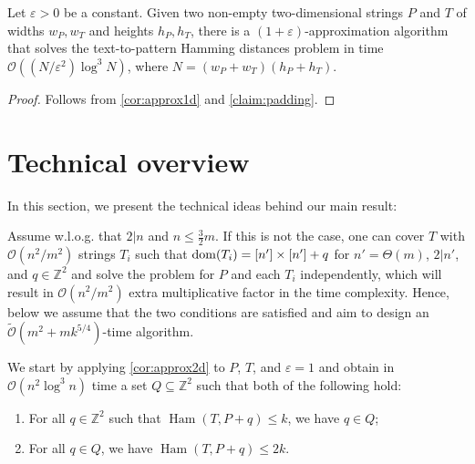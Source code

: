 \documentclass[twoside,leqno]{article}
\newcommand{\Z}{\mathbb{Z}}
\renewcommand{\O}{\mathcal{O}}
\newcommand{\tO}{\tilde{\mathcal{O}}}
\DeclareMathOperator*{\Ham}{Ham}
\begin{document}
\begin{corollary}\label{cor:approx2d}
Let $\varepsilon > 0$ be a constant. Given two non-empty two-dimensional strings $P$ and $T$ of widths $w_P, w_T$ and heights $h_P, h_T$, there is a $(1+\varepsilon)$-approximation algorithm that solves the text-to-pattern Hamming distances problem in time $\O((N/\varepsilon^2)  \log^3 N)$, where $N = (w_P + w_T)(h_P + h_T)$.
\end{corollary}
\begin{proof}
Follows from \cref{cor:approx1d} and \cref{claim:padding}. 
\end{proof}


\section{Technical overview}
In this section, we present the technical ideas behind our main result:


\def\mainThmTitle{Formal version}
\def\mainThmContent{%
Given two-dimensional strings $P$ with $\d{P} = [m] \times [m]$ and $T$ with $\d{T} = [n] \times [n]$, where $m,n\in Z^+$ and $m \le n$. There is an algorithm that solves the $k$-mismatch problem for $P,T$ in $\tO((m^2 + mk^{5/4})n^2 / m^2)$ time.%
}

\restateThmMain*

Assume w.l.o.g. that $2|n$ and $n \le \frac{3}{2}m$. If this is not the case, one can cover $T$ with $\O(n^2/m^2)$ strings $T_i$ such that $\operatorname*{dom}(T_i) = [n'] \times [n'] + q$ for $n' = \Theta(m)$, $2|n'$, and $q \in \Z^2$ and solve the problem for $P$ and each $T_i$ independently, which will result in $\O(n^2/m^2)$ extra multiplicative factor in the time complexity. Hence, below we assume that the two conditions are satisfied and aim to design an $\tO(m^2 + mk^{5/4})$-time algorithm. 

We start by applying \cref{cor:approx2d} to $P$, $T$, and $\varepsilon = 1$ and obtain in $\O(n^2 \log^3 n)$ time a set $Q \subseteq \Z^2$ such that both of the following hold:
\begin{enumerate}
\item For all $q \in \Z^2$ such that $\Ham(T, P+q) \le k$, we have $q \in Q$;
\item For all $q \in Q$, we have $\Ham(T, P+q) \le 2 k$.
\end{enumerate}
\end{document}

